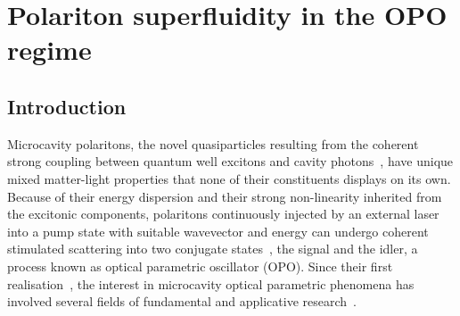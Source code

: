 

\chapter{Polariton superfluidity in the OPO regime}
\label{cha:opo}




\section{Introduction}
%
Microcavity polaritons, the novel quasiparticles resulting from the
coherent strong coupling between quantum well excitons and cavity
photons~\cite{9780199228942}, have unique mixed matter-light
properties that none of their constituents displays on its
own. Because of their energy dispersion and their strong non-linearity
inherited from the excitonic components, polaritons continuously
injected by an external laser into a pump state with suitable
wavevector and energy can undergo coherent stimulated scattering into
two conjugate states~\cite{Ciuti_2000,Ciuti_2001,Ciuti_2003}, the signal
and the idler, a process known as optical parametric oscillator (OPO).
%
Since their first
realisation~\cite{Stevenson_2000,Savvidis_2000,Savvidis_2000_b,Baumberg_2000,Saba_2001},
the interest in microcavity optical parametric phenomena has involved
several fields of fundamental and applicative
research~\cite{Edamatsu_2004,Savasta_2005,Lanco_2006,Abbarchi_2011,Ardizzone_2012,Xie_2012,Lecomte_2013}.

